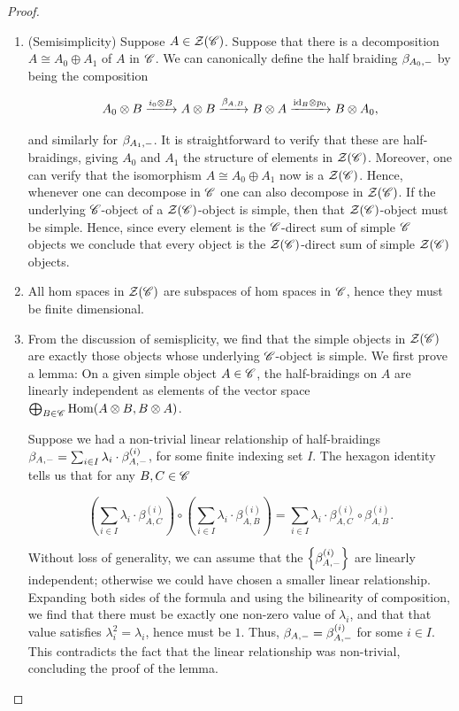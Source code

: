\documentclass{article}
\theoremstyle{definition}
\numberwithin{figure}{section}
\begin{document}
\begin{enumerate}[\thesection .1.]
\begin{proof}
\begin{enumerate}
\item (Semisimplicity) Suppose $A\in \mathcal{Z}(\mathscr{C})$. Suppose that there is a decomposition $A\cong A_0\oplus A_1$ of $A$ in $\mathscr{C}$. We can canonically define the half braiding $\beta_{A_0,\--}$ by being the composition

$$A_0\otimes B\xrightarrow{i_0\otimes B} A\otimes B \xrightarrow{\beta_{A,B}}B\otimes A \xrightarrow{\mathrm{id}_{B}\otimes p_{0}}B\otimes A_0,$$

and similarly for $\beta_{A_1,\--}$. It is straightforward to verify that these are half-braidings, giving $A_0$ and $A_1$ the structure of elements in $\mathcal{Z}(\mathscr{C})$. Moreover, one can verify that the isomorphism $A\cong A_0\oplus A_1$ now is a $\mathcal{Z}(\mathscr{C})$. Hence, whenever one can decompose in $\mathscr{C}$ one can also decompose in $\mathcal{Z}(\mathscr{C})$. If the underlying $\mathscr{C}$-object of a $\mathcal{Z}(\mathscr{C})$-object is simple, then that $\mathcal{Z}(\mathscr{C})$-object must be simple. Hence, since every element is the $\mathscr{C}$-direct sum of simple $\mathscr{C}$ objects we conclude that every object is the $\mathcal{Z}(\mathscr{C})$-direct sum of simple $\mathcal{Z}(\mathscr{C})$ objects.

\item All hom spaces in $\mathcal{Z}(\mathscr{C})$ are subspaces of hom spaces in $\mathscr{C}$, hence they must be finite dimensional.

\item From the discussion of semisplicity, we find that the simple objects in $\mathcal{Z}(\mathscr{C})$ are exactly those objects whose underlying $\mathscr{C}$-object is simple. We first prove a lemma: On a given simple object $A\in \mathscr{C}$, the half-braidings on $A$ are linearly independent as elements of the vector space $\bigoplus_{B\in \mathscr{C}}\mathrm{Hom}(A\otimes B, B\otimes A)$.

Suppose we had a non-trivial linear relationship of half-braidings $\beta_{A,\--}=\sum_{i\in I}\lambda_i \cdot \beta^{(i)}_{A,\--}$, for some finite indexing set $I$. The hexagon identity tells us that for any $B,C\in \mathscr{C}$

$$\left(\sum_{i\in I}\lambda_i\cdot \beta_{A,C}^{(i)}\right)\circ \left(\sum_{i\in I}\lambda_i\cdot \beta_{A,B}^{(i)}\right)=\sum_{i\in I}\lambda_i \cdot \beta_{A,C}^{(i)}\circ \beta_{A,B}^{(i)}.$$

Without loss of generality, we can assume that the $\left\{\beta_{A,\--}^{(i)}\right\}$ are linearly independent; otherwise we could have chosen a smaller linear relationship. Expanding both sides of the formula and using the bilinearity of composition, we find that there must be exactly one non-zero value of $\lambda_i$, and that that value satisfies $\lambda_i^2=\lambda_i$, hence must be $1$. Thus, $\beta_{A,\--}=\beta^{(i)}_{A,\--}$ for some $i\in I$. This contradicts the fact that the linear relationship was non-trivial, concluding the proof of the lemma.


\end{enumerate}
\end{proof}
\end{enumerate}
\end{document}
